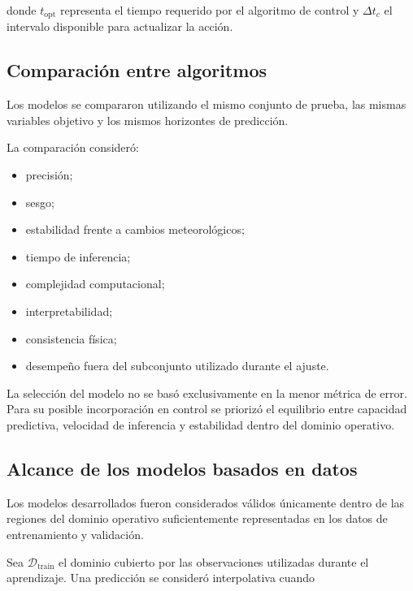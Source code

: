 donde $t_{\mathrm{opt}}$ representa el tiempo requerido por el algoritmo de control y $\Delta t_c$ el intervalo disponible para actualizar la acción.

\subsection{Comparación entre algoritmos}
\label{subsec:comparacion_algoritmos_ml}

Los modelos se compararon utilizando el mismo conjunto de prueba, las mismas variables objetivo y los mismos horizontes de predicción.

La comparación consideró:

\begin{itemize}
    \item precisión;
    \item sesgo;
    \item estabilidad frente a cambios meteorológicos;
    \item tiempo de inferencia;
    \item complejidad computacional;
    \item interpretabilidad;
    \item consistencia física;
    \item desempeño fuera del subconjunto utilizado durante el ajuste.
\end{itemize}

La selección del modelo no se basó exclusivamente en la menor métrica de error. Para su posible incorporación en control se priorizó el equilibrio entre capacidad predictiva, velocidad de inferencia y estabilidad dentro del dominio operativo.

\subsection{Alcance de los modelos basados en datos}
\label{subsec:alcance_modelos_data_driven}

Los modelos desarrollados fueron considerados válidos únicamente dentro de las regiones del dominio operativo suficientemente representadas en los datos de entrenamiento y validación.

Sea $\mathcal{D}_{\mathrm{train}}$ el dominio cubierto por las observaciones utilizadas durante el aprendizaje. Una predicción se consideró interpolativa cuando

